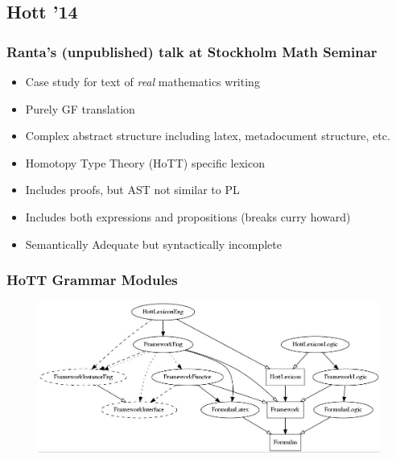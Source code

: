\documentclass[10pt]{beamer}
\begin{document}
\subsection{Hott '14}

\begin{frame}
\frametitle{Ranta's (unpublished) talk at Stockholm Math Seminar}
\begin{itemize}
\item Case study for text of \emph{real} mathematics writing
\item Purely GF translation
\item Complex abstract structure including latex, metadocument structure, etc.
\item Homotopy Type Theory (HoTT) specific lexicon
\item Includes proofs, but AST not similar to PL
\item Includes both expressions and propositions (breaks curry howard)
\item Semantically Adequate but syntactically incomplete
\end{itemize}
\end{frame}


\begin{frame}
\frametitle{HoTT Grammar Modules}

\begin{figure}
\hspace*{-3mm}%
   \includegraphics[width= \paperwidth]{testdep3.jpg}
\end{figure}
\end{frame}
\end{document}
